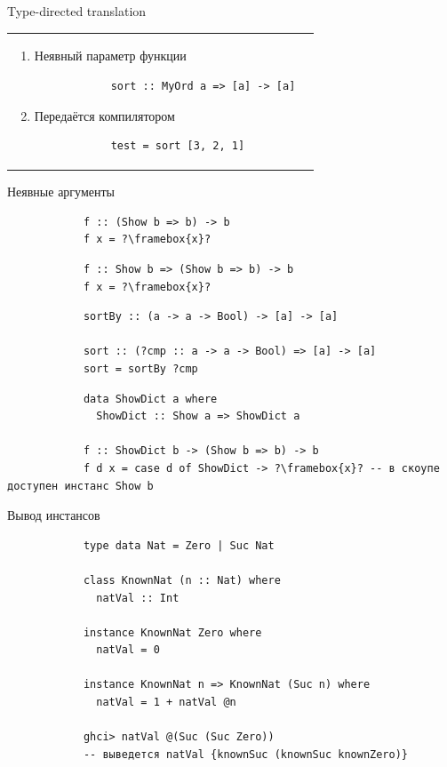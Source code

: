 \begin{frame}[fragile]{Type-directed translation}
\begin{tabular}{p{7cm}p{7cm}}
\begin{enumerate}
\begin{verbatim}
                \end{verbatim}
                \item Неявный параметр функции
                \begin{verbatim}
            sort :: MyOrd a => [a] -> [a]
                \end{verbatim}
                \item Передаётся компилятором
                \begin{verbatim}
            test = sort [3, 2, 1]
                \end{verbatim}
            \end{enumerate}
        \end{tabular}
    \end{frame}

    \begin{frame}[fragile]{Неявные аргументы}
        \pause
        \begin{verbatim}
            f :: (Show b => b) -> b
            f x = ?\framebox{x}?
        \end{verbatim}
        \pause\vspace{1em}
        \begin{verbatim}
            f :: Show b => (Show b => b) -> b
            f x = ?\framebox{x}?
        \end{verbatim}
        \pause\vspace{1em}
        \begin{verbatim}
            sortBy :: (a -> a -> Bool) -> [a] -> [a]

            sort :: (?cmp :: a -> a -> Bool) => [a] -> [a]
            sort = sortBy ?cmp
        \end{verbatim}
        \pause\vspace{1em}
        \begin{verbatim}
            data ShowDict a where
              ShowDict :: Show a => ShowDict a

            f :: ShowDict b -> (Show b => b) -> b
            f d x = case d of ShowDict -> ?\framebox{x}? -- в скоупе доступен инстанс Show b
        \end{verbatim}
    \end{frame}

    \begin{frame}[fragile]{Вывод инстансов}
        \pause
        \begin{verbatim}
            type data Nat = Zero | Suc Nat

            class KnownNat (n :: Nat) where
              natVal :: Int

            instance KnownNat Zero where
              natVal = 0

            instance KnownNat n => KnownNat (Suc n) where
              natVal = 1 + natVal @n

            ghci> natVal @(Suc (Suc Zero))
            -- выведется natVal {knownSuc (knownSuc knownZero)}
        \end{verbatim}
    \end{frame}

